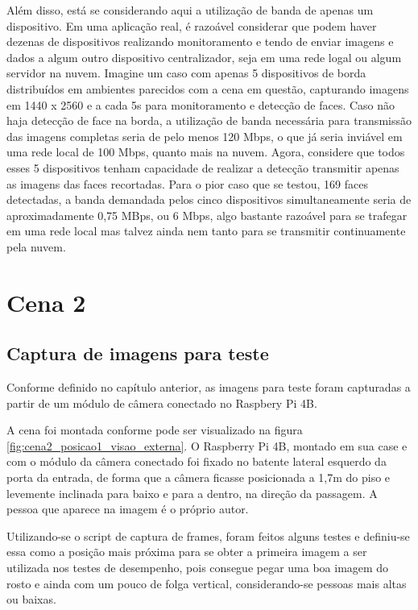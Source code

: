 Além disso, está se considerando aqui a utilização de banda de apenas um dispositivo. Em uma aplicação real, é razoável considerar que podem haver dezenas de dispositivos realizando monitoramento e tendo de enviar imagens e dados a algum outro dispositivo centralizador, seja em uma rede logal ou algum servidor na nuvem. Imagine um caso com apenas 5 dispositivos de borda distribuídos em ambientes parecidos com a cena em questão, capturando imagens em 1440 x 2560 e a cada 5s para monitoramento e detecção de faces. Caso não haja detecção de face na borda, a utilização de banda necessária para transmissão das imagens completas seria de pelo menos 120 Mbps, o que já seria inviável em uma rede local de 100 Mbps, quanto mais na nuvem.
Agora, considere que todos esses 5 dispositivos tenham capacidade de realizar a detecção transmitir apenas as imagens das faces recortadas. Para o pior caso que se testou, 169 faces detectadas, a banda demandada pelos cinco dispositivos simultaneamente seria de aproximadamente 0,75 MBps, ou 6 Mbps, algo bastante razoável para se trafegar em uma rede local mas talvez ainda nem tanto para se transmitir continuamente pela nuvem.

\section{Cena 2}

\subsection{Captura de imagens para teste}

Conforme definido no capítulo anterior, as imagens para teste foram capturadas a partir de um módulo de câmera conectado no Raspbery Pi 4B.

A cena foi montada conforme pode ser visualizado na figura \ref{fig:cena2_posicao1_visao_externa}. O Raspberry Pi 4B, montado em sua case e com o módulo da câmera conectado foi fixado no batente lateral esquerdo da porta da entrada, de forma que a câmera ficasse posicionada a 1,7m do piso e levemente inclinada para baixo e para a dentro, na direção da passagem. A pessoa que aparece na imagem é o próprio autor.

Utilizando-se o script de captura de frames, foram feitos alguns testes e definiu-se essa como a posição mais próxima para se obter a primeira imagem a ser utilizada nos testes de desempenho, pois consegue pegar uma boa imagem do rosto e ainda com um pouco de folga vertical, considerando-se pessoas mais altas ou baixas.

